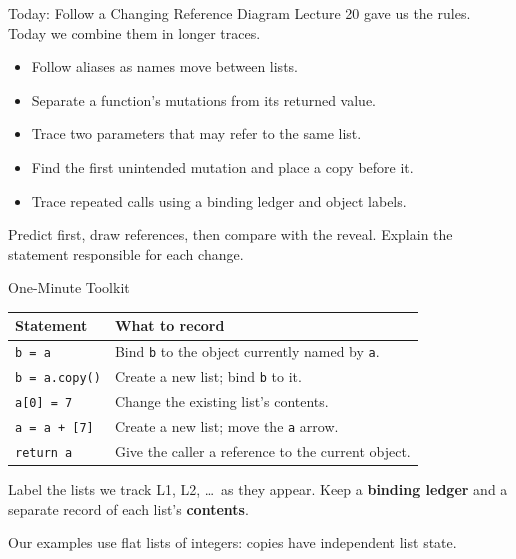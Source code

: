\documentclass[aspectratio=169,10pt]{beamer}
\begin{document}
\makedecktitle

\begin{frame}{Today: Follow a Changing Reference Diagram}
  Lecture 20 gave us the rules. Today we combine them in longer traces.
  \begin{itemize}
    \item Follow aliases as names move between lists.
    \item Separate a function's mutations from its returned value.
    \item Trace two parameters that may refer to the same list.
    \item Find the first unintended mutation and place a copy before it.
    \item Trace repeated calls using a binding ledger and object labels.
  \end{itemize}
  \begin{activity}
    Predict first, draw references, then compare with the reveal. Explain the statement responsible for each change.
  \end{activity}
\end{frame}

\begin{frame}{One-Minute Toolkit}
  \begin{center}
    \renewcommand{\arraystretch}{1.3}
    \begin{tabular}{l|l}
      \textbf{Statement} & \textbf{What to record} \\\hline
      \texttt{b = a} & Bind \texttt{b} to the object currently named by \texttt{a}. \\
      \texttt{b = a.copy()} & Create a new list; bind \texttt{b} to it. \\
      \texttt{a[0] = 7} & Change the existing list's contents. \\
      \texttt{a = a + [7]} & Create a new list; move the \texttt{a} arrow. \\
      \texttt{return a} & Give the caller a reference to the current object.
    \end{tabular}
  \end{center}
  \begin{keyidea}
    Label the lists we track L1, L2, \ldots\ as they appear. Keep a \textbf{binding ledger} and a separate record of each list's \textbf{contents}.
  \end{keyidea}
  Our examples use flat lists of integers: copies have independent list state.
\end{frame}
\end{document}
